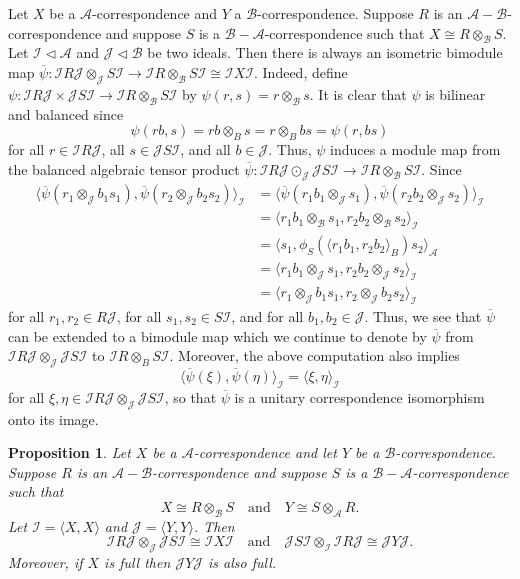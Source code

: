 \documentclass[11pt, letterpaper,final]{amsart}
\newcommand{\A}{{\mathcal{A}}}
\newcommand{\B}{{\mathcal{B}}}
\newcommand{\I}{{\mathcal{I}}}
\newcommand{\J}{{\mathcal{J}}}
\newtheorem{prp}[thm]{Proposition}
\theoremstyle{definition}
\begin{document}
Let $X$ be a $\A$-correspondence and $Y$ a $\B$-correspondence. Suppose $R$ is an $\A-\B$-correspondence and suppose $S$ is a $\B-\A$-correspondence such that $X \cong R \otimes_{\B} S$. Let $\I \lhd \A$ and $\J \lhd \B$ be two ideals. Then there is always an isometric bimodule map $\overline{\psi}: \I R \J \otimes_{\J} S \I \rightarrow \I R \otimes_{\B} S \I \cong \I X \I$. Indeed, define $\psi \colon \I R \J \times \J S \I \to \I R \otimes_{\B} S \I$ by $\psi( r, s) = r \otimes_{\B} s$.  It is clear that $\psi$ is bilinear and balanced since 
$$
\psi( rb, s) = rb \otimes_{B} s = r \otimes_{B} bs = \psi( r, b s)
$$
for all $r \in \I R \J$, all $s\in \J S \I$, and all $b \in \J$. Thus, $\psi$ induces a module map from the balanced algebraic tensor product $\overline{\psi} \colon \I R \J \odot_{\J} \J S \I \to \I R \otimes_{\B} S \I$. Since 
\begin{align*}
\langle \overline{\psi} ( r_1 \otimes_{\J} b_1 s_1 ), \overline{\psi} ( r_2 \otimes_{\J} b_2 s_2 ) \rangle_{\I} &= \langle \overline{\psi} ( r_1 b_1 \otimes_{\J} s_1 ), \overline{\psi} ( r_2 b_2 \otimes_{\J} s_2 ) \rangle_{\I}  \\
&= \langle r_1 b_1 \otimes_{\B} s_1 , r_2 b_2 \otimes_{\B} s_2 \rangle_{\I} \\
&= \langle s_1 , \phi_S (\langle r_1 b_1 , r_2 b_2 \rangle_B ) s_2 \rangle_{\A} \\
&= \langle r_1 b_1 \otimes_{\J} s_1, r_2 b_2 \otimes_{\J} s_2 \rangle_{\I} \\
&= \langle r_1 \otimes_{\J} b_1 s_1 , r_2 \otimes_{\J} b_2 s_2 \rangle_{\I}
\end{align*}
for all $r_1, r_2 \in R \J$, for all $s_1, s_2 \in S \I$, and for all $b_1, b_2 \in \J$. Thus, we see that $\overline{\psi}$ can be extended to a bimodule map which we continue to denote by $\overline{\psi}$ from $\I R \J \otimes_{\J} \J S \I$ to $\I R \otimes_{B} S \I$.  Moreover, the above computation also implies 
$$
\langle \overline{\psi}(\xi), \overline{\psi}(\eta) \rangle_{\I} = \langle \xi , \eta \rangle_{\I}
$$
for all $\xi,\eta \in \I R \J \otimes_{\J} \J S\I$, so that $\overline{\psi}$ is a unitary correspondence isomorphism onto its image.

\begin{prp} \label{prp:to-full}
Let $X$ be a $\A$-correspondence and let $Y$ be a $\B$-correspondence.  Suppose $R$ is an $\A-\B$-correspondence and suppose $S$ is a $\B-\A$-correspondence such that 
$$
X \cong R \otimes_{\B} S \quad \text{and} \quad Y \cong S \otimes_{\A} R.
$$
Let $\I = \langle X,X \rangle$ and $\J = \langle Y, Y \rangle$.  Then  
$$
\I R \J \otimes_{\J} \J S \I \cong \I X \I \quad \text{and} \quad \J S \I \otimes_{\I} \I R \J \cong \J Y \J.$$
Moreover, if $X$ is full then $ \J Y \J$ is also full.
\end{prp}
\end{document}
